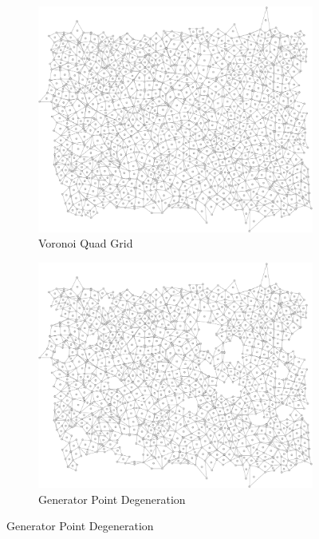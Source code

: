 \documentclass[a4paper,11pt]{article}
\begin{document}
\begin{figure}[htp]
\centering

  \begin{subfigure}[t]{0.5\textwidth}
  \includegraphics[width=\textwidth]{ch3_figs/vquad_stoma_v2}
  \caption{Voronoi Quad Grid}
  \label{fig:vquad_grid}
  \end{subfigure}

  \begin{subfigure}[t]{0.5\textwidth}
  \centering
  \includegraphics[width=\textwidth]{ch3_figs/gen_pt_degen_7}
  \caption{Generator Point Degeneration}
  \label{fig:genpt_degen}
  \end{subfigure}


\end{figure}
\end{document}
